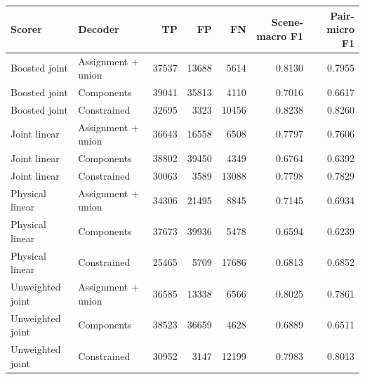 \begin{tabularx}{\linewidth}{@{}llrrrrr@{}}\toprule
Scorer & Decoder & TP & FP & FN & Scene-macro F1 & Pair-micro F1 \\\midrule
Boosted joint & Assignment + union & 37537 & 13688 & 5614 & 0.8130 & 0.7955 \\
Boosted joint & Components & 39041 & 35813 & 4110 & 0.7016 & 0.6617 \\
Boosted joint & Constrained & 32695 & 3323 & 10456 & 0.8238 & 0.8260 \\
Joint linear & Assignment + union & 36643 & 16558 & 6508 & 0.7797 & 0.7606 \\
Joint linear & Components & 38802 & 39450 & 4349 & 0.6764 & 0.6392 \\
Joint linear & Constrained & 30063 & 3589 & 13088 & 0.7798 & 0.7829 \\
Physical linear & Assignment + union & 34306 & 21495 & 8845 & 0.7145 & 0.6934 \\
Physical linear & Components & 37673 & 39936 & 5478 & 0.6594 & 0.6239 \\
Physical linear & Constrained & 25465 & 5709 & 17686 & 0.6813 & 0.6852 \\
Unweighted joint & Assignment + union & 36585 & 13338 & 6566 & 0.8025 & 0.7861 \\
Unweighted joint & Components & 38523 & 36659 & 4628 & 0.6889 & 0.6511 \\
Unweighted joint & Constrained & 30952 & 3147 & 12199 & 0.7983 & 0.8013 \\
\bottomrule\end{tabularx}
